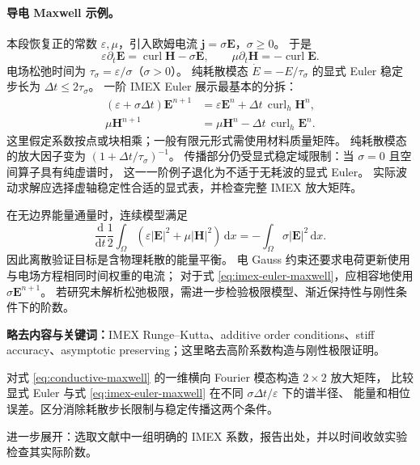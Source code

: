 \documentclass[UTF8,11pt,openany]{ctexbook}
\numberwithin{equation}{chapter}
\theoremstyle{definition}
\theoremstyle{remark}
\newcommand{\dd}{\mathrm d}
\newcommand{\curl}{\operatorname{curl}}
\begin{document}
\paragraph{导电 Maxwell 示例。}
本段恢复正的常数 $\varepsilon,\mu$，引入欧姆电流 $\bm j=\sigma\bm E$，$\sigma\geq0$。
于是
\begin{equation}\label{eq:conductive-maxwell}
\varepsilon\partial_t\bm E=\curl\bm H-\sigma\bm E,\qquad
\mu\partial_t\bm H=-\curl\bm E.
\end{equation}
电场松弛时间为 $\tau_\sigma=\varepsilon/\sigma$（$\sigma>0$）。
纯耗散模态 $\dot E=-E/\tau_\sigma$ 的显式 Euler 稳定步长为 $\Delta t\leq2\tau_\sigma$。
一阶 IMEX Euler 展示最基本的分拆：
\begin{equation}\label{eq:imex-euler-maxwell}
\begin{aligned}
(\varepsilon+\sigma\Delta t)\bm E^{n+1}
 &=\varepsilon\bm E^n+\Delta t\,\curl_h\bm H^n,\\
\mu\bm H^{n+1}&=\mu\bm H^n-\Delta t\,\curl_h\bm E^n.
\end{aligned}
\end{equation}
这里假定系数按点或块相乘；一般有限元形式需使用材料质量矩阵。
纯耗散模态的放大因子变为 $(1+\Delta t/\tau_\sigma)^{-1}$。
传播部分仍受显式稳定域限制：当 $\sigma=0$ 且空间算子具有纯虚谱时，
这一一阶例子退化为不适于无耗波的显式 Euler。
实际波动求解应选择虚轴稳定性合适的显式表，并检查完整 IMEX 放大矩阵。

在无边界能量通量时，连续模型满足
\begin{equation}\label{eq:conductive-energy}
\frac{\dd}{\dd t}\frac12\int_\Omega
(\varepsilon|\bm E|^2+\mu|\bm H|^2)\,\dd x
=-\int_\Omega\sigma|\bm E|^2\,\dd x.
\end{equation}
因此离散验证目标是含物理耗散的能量平衡。
电 Gauss 约束还要求电荷更新使用与电场方程相同时间权重的电流；
对于式 \eqref{eq:imex-euler-maxwell}，应相容地使用 $\sigma\bm E^{n+1}$。
若研究未解析松弛极限，需进一步检验极限模型、渐近保持性与刚性条件下的阶数。

\begin{askai}
\textbf{略去内容与关键词：}IMEX Runge--Kutta、additive order conditions、stiff accuracy、asymptotic preserving；这里略去高阶系数构造与刚性极限证明。

对式 \eqref{eq:conductive-maxwell} 的一维横向 Fourier 模态构造 $2\times2$ 放大矩阵，
比较显式 Euler 与式 \eqref{eq:imex-euler-maxwell} 在不同 $\sigma\Delta t/\varepsilon$ 下的谱半径、
能量和相位误差。区分消除耗散步长限制与稳定传播这两个条件。

进一步展开：选取文献中一组明确的 IMEX 系数，报告出处，并以时间收敛实验检查其实际阶数。
\end{askai}
\end{document}
